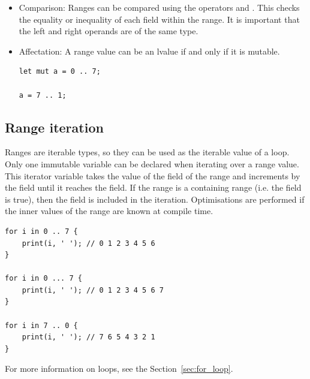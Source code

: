 \begin{itemize}
\item Comparison: Ranges can be compared using the operators \token{==} and
  \token{!=}. This checks the equality or inequality of each field within the
  range. It is important that the left and right operands are of the same type.

\item Affectation: A range value can be an lvalue if and only if it is mutable.
  \begin{lstlisting}[style=coloredverbatim]
let mut a = 0 .. 7;

a = 7 .. 1;
  \end{lstlisting}

\end{itemize}

\subsection {Range iteration}

 Ranges are iterable types, so they can be used as the iterable value of a
  loop. Only one immutable variable can be declared when iterating
 over a range value. This iterator variable takes the value of the 
 field of the range and increments by the  field until it reaches
 the  field. If the range is a containing range (i.e. the
  field is true), then the  field is included in
 the iteration. Optimisations are performed if the inner values of the range are
 known at compile time.

\begin{lstlisting}[style=coloredverbatim]
for i in 0 .. 7 {
    print(i, ' '); // 0 1 2 3 4 5 6
}

for i in 0 ... 7 {
    print(i, ' '); // 0 1 2 3 4 5 6 7
}

for i in 7 .. 0 {
    print(i, ' '); // 7 6 5 4 3 2 1
}
\end{lstlisting}

For more information on  loops, see the Section~\ref{sec:for_loop}.

\vfill%
\pagebreak
